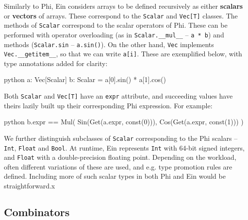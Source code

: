 Similarly to Phi, Ein considers arrays to be defined recursively as either \textbf{scalars} or \textbf{vectors} of arrays. These correspond to the \texttt{Scalar} and \texttt{Vec[T]} classes. The methods of \texttt{Scalar} correspond to the scalar operators of Phi. These can be performed with operator overloading (as in \texttt{Scalar.\_\_mul\_\_} -- \texttt{a * b}) and methods (\texttt{Scalar.sin} -- \texttt{a.sin()}). On the other hand, \texttt{Vec} implements \texttt{Vec.\_\_getitem\_\_}, so that we can write \texttt{a[i]}. These are exemplified below, with type annotations added for clarity:
\begin{center}
\begin{cminted}{python}
a: Vec[Scalar]
b: Scalar = a[0].sin() * a[1].cos()
\end{cminted}
\end{center}
Both \texttt{Scalar} and \texttt{Vec[T]} have an \texttt{expr} attribute, and succeeding values have theirs lazily built up their corresponding Phi expression. For example: 
\begin{center}
\begin{cminted}{python}
b.expr == Mul(
    Sin(Get(a.expr, const(0))), 
    Cos(Get(a.expr, const(1)))
)
\end{cminted}
\end{center}

We further distinguish subclasses of \texttt{Scalar} corresponding to the Phi scalars -- \texttt{Int}, \texttt{Float} and \texttt{Bool}. At runtime, Ein represents \texttt{Int} with 64-bit signed integers, and \texttt{Float} with a double-precision floating point. Depending on the workload, often different variations of these are used, and e.g. type promotion rules are defined. Including more of such scalar types in both Phi and Ein would be straightforward.x

\subsection{Combinators}

